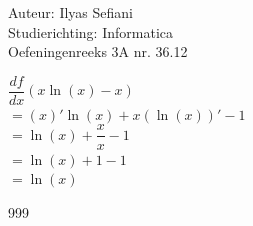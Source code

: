 \documentclass[a4paper]{article}
\begin{document}
\noindent \large Auteur: Ilyas Sefiani \\
\noindent \large Studierichting: Informatica\\
\noindent \large Oefeningenreeks 3A nr. 36.12\\

\medskip

\normalsize

$\dfrac{df}{dx}(x\ln(x)-x)$\\

$= (x)'\ln(x)+x(\ln(x))'-1$\\

$= \ln(x)+\dfrac{x}{x}-1$\\

$= \ln(x)+1-1$\\

$= \ln(x)$\\

\begin{thebibliography}{999}
\end{thebibliography}
\end{document}
